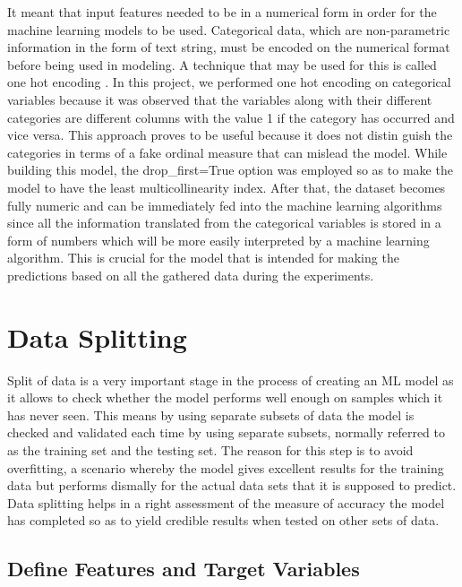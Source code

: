 \documentclass[12pt, a4paper,oneside]{book}
\numberwithin{equation}{section}
\begin{document}
It meant that input features needed to be in a numerical form in order for the machine learning models to be used. Categorical data, which are non-parametric information in the form of text string, must be encoded on the numerical format before being used in modeling. A technique that may be used for this is called one hot encoding \cite{15}. In this project, we performed one hot encoding on categorical variables because it was observed that the variables along with their different categories are different columns with the value 1 if the category has occurred and vice versa. This approach proves to be useful because it does not distin guish the categories in terms of a fake ordinal measure that can mislead the model. While building this model, the drop\_first=True option was employed so as to make the model to have the least multicollinearity index. After that, the dataset becomes fully numeric and can be immediately fed into the machine learning algorithms since all the information translated from the categorical variables is stored in a form of numbers which will be more easily interpreted by a machine learning algorithm. This is crucial for the model that is intended for making the predictions based on all the gathered data during the experiments. 

\section{Data Splitting}

Split of data is a very important stage in the process of creating an ML model as it allows to check whether the model performs well enough on samples which it has never seen. This means by using separate subsets of data the model is checked and validated each time by using separate subsets, normally referred to as the training set and the testing set. The reason for this step is to avoid overfitting, a scenario whereby the model gives excellent results for the training data but performs dismally for the actual data sets that it is supposed to predict. Data splitting helps in a right assessment of the measure of accuracy the model has completed so as to yield credible results when tested on other sets of data. 

\subsection{Define Features and Target Variables}
\end{document}
